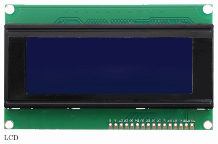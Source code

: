 \begin{figure}[H]
	\centering
	\includegraphics[scale=.5]{./image/PESTA/material/4x20_LCD.jpg}
	\caption{LCD}
	\label{4x20_LCD}
\end{figure}
\newpage
